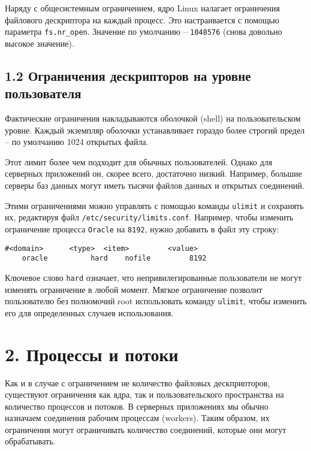 Наряду с общесистемным ограничением, ядро Linux налагает ограничения файлового дескриптора на каждый процесс. Это настраивается с помощью параметра \texttt{fs.nr\_open}. Значение по умолчанию -- \texttt{1048576} (снова довольно высокое значение).

\subsection*{1.2 Ограничения дескрипторов на уровне пользователя}

Фактические ограничения накладываются оболочкой (shell) на пользовательском уровне. Каждый экземпляр оболочки устанавливает гораздо более строгий предел -- по умолчанию 1024 открытых файла.

Этот лимит более чем подходит для обычных пользователей. Однако для серверных приложений он, скорее всего, достаточно низкий. Например, большие серверы баз данных могут иметь тысячи файлов данных и открытых соединений.

Этими ограничениями можно управлять с помощью команды \texttt{ulimit} и сохранять их, редактируя файл \texttt{/etc/security/limits.conf}. Например, чтобы изменить ограничение процесса \texttt{Oracle} на \texttt{8192}, нужно добавить в файл эту строку:

\begin{Verbatim}[frame=single,breaklines=true,breakanywhere=true]
    #<domain>      <type>  <item>         <value>
    oracle          hard    nofile         8192
\end{Verbatim}

Ключевое слово \texttt{hard} означает, что непривилегированные пользователи не могут изменять ограничение в любой момент. Мягкое ограничение позволит пользователю без полномочий root использовать команду \texttt{ulimit}, чтобы изменить его для определенных случаев использования.

\section*{2. Процессы и потоки}

Как и в случае с ограничением не количество файловых дескприпторов, существуют ограничения как ядра, так и пользовательского пространства на количество процессов и потоков. В серверных приложениях мы обычно назначаем соединения рабочим процессам (workers). Таким образом, их ограничения могут ограничивать количество соединений, которые они могут обрабатывать.

